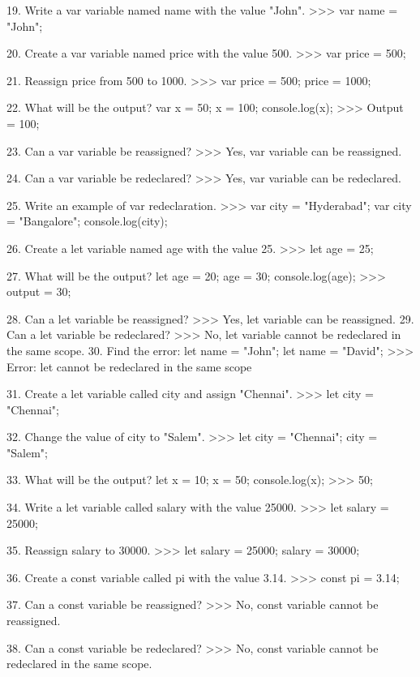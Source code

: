 19. Write a var variable named name with the value "John".
    >>> var name = "John";

20. Create a var variable named price with the value 500.
    >>> var price = 500;

21. Reassign price from 500 to 1000.
    >>> var price = 500;
        price = 1000;

22. What will be the output?
    var x = 50;
    x = 100;
    console.log(x);
    >>> Output = 100;

23. Can a var variable be reassigned?
    >>> Yes, var variable can be reassigned.

24. Can a var variable be redeclared?
    >>> Yes, var variable can be redeclared.

25. Write an example of var redeclaration.
    >>> var city = "Hyderabad";
        var city = "Bangalore";
        console.log(city);

26. Create a let variable named age with the value 25.
    >>> let age = 25;

27. What will be the output?
    let age = 20;
    age = 30;
    console.log(age);
    >>> output = 30;

28. Can a let variable be reassigned?
    >>> Yes, let variable can be reassigned.
29. Can a let variable be redeclared?
    >>> No, let variable cannot be redeclared in the same scope.
30. Find the error:
    let name = "John";
    let name = "David";
    >>>  Error: let cannot be redeclared in the same scope

31. Create a let variable called city and assign "Chennai".
    >>> let city = "Chennai";

32. Change the value of city to "Salem".
    >>> let city = "Chennai";
        city = "Salem";

33. What will be the output?
    let x = 10;
    x = 50;
    console.log(x);
    >>> 50;

34. Write a let variable called salary with the value 25000.
    >>> let salary = 25000;

35. Reassign salary to 30000.
    >>> let salary = 25000;
        salary = 30000;

36. Create a const variable called pi with the value 3.14.
    >>> const pi = 3.14;

37. Can a const variable be reassigned?
    >>> No, const variable cannot be reassigned.

38. Can a const variable be redeclared?
    >>> No, const variable cannot be redeclared in the same scope.

